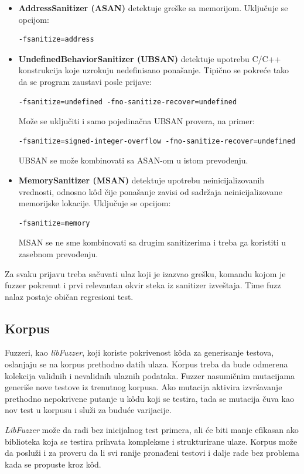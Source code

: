 \begin{itemize}
\item
  \textbf{AddressSanitizer (ASAN)} detektuje greške sa memorijom. Uključuje se opcijom:
\begin{verbatim}
-fsanitize=address
\end{verbatim}
\item
  \textbf{UndefinedBehaviorSanitizer (UBSAN)} detektuje upotrebu C/C++ konstrukcija koje uzrokuju nedefinisano ponašanje. Tipično se pokreće tako da se program zaustavi posle prijave:
\begin{verbatim}
-fsanitize=undefined -fno-sanitize-recover=undefined
\end{verbatim}
  Može se uključiti i samo pojedinačna UBSAN provera, na primer:
\begin{verbatim}
-fsanitize=signed-integer-overflow -fno-sanitize-recover=undefined
\end{verbatim}
  UBSAN se može kombinovati sa ASAN-om u istom prevođenju.
\item
  \textbf{MemorySanitizer (MSAN)} detektuje upotrebu neinicijalizovanih vrednosti, odnosno kôd čije ponašanje zavisi od sadržaja neinicijalizovane memorijske lokacije. Uključuje se opcijom:
\begin{verbatim}
-fsanitize=memory
\end{verbatim}
  MSAN se ne sme kombinovati sa drugim sanitizerima i treba ga koristiti u zasebnom prevođenju.
\end{itemize}

Za svaku prijavu treba sačuvati ulaz koji je izazvao grešku, komandu kojom je fuzzer pokrenut i prvi relevantan okvir steka iz sanitizer izveštaja. Time fuzz nalaz postaje običan regresioni test.

\subsection{Korpus}\label{korpus}

Fuzzeri, kao \emph{libFuzzer}, koji koriste pokrivenost kôda za generisanje testova, oslanjaju se na korpus prethodno datih ulaza. Korpus treba da bude odmerena kolekcija validnih i nevalidnih ulaznih podataka. Fuzzer nasumičnim mutacijama generiše nove testove iz trenutnog korpusa. Ako mutacija aktivira izvršavanje prethodno nepokrivene putanje u kôdu koji se testira, tada se mutacija čuva kao nov test u korpusu i služi za buduće varijacije.

\emph{LibFuzzer} može da radi bez inicijalnog test primera, ali će biti manje efikasan ako biblioteka koja se testira prihvata kompleksne i strukturirane ulaze. Korpus može da posluži i za proveru da li svi ranije pronađeni testovi i dalje rade bez problema kada se propuste kroz kôd.

